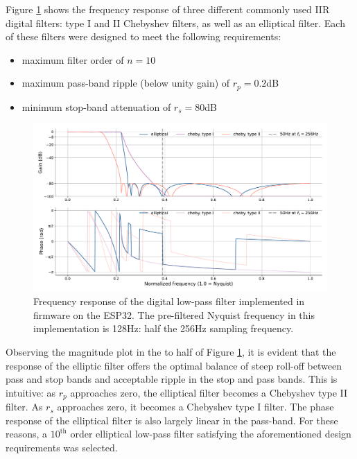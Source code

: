 Figure \ref{fig:digital-filt-resp} shows the frequency response of three different commonly used IIR digital filters: type I and II Chebyshev filters, as well as an elliptical filter. Each of these filters were designed to meet the following requirements:
\begin{itemize}
\label{list:filter-design-reqs}
    \item maximum filter order of $n=10$
    \item maximum pass-band ripple (below unity gain) of $r_p=0.2$dB 
    \item minimum stop-band attenuation of $r_s=80$dB
\end{itemize}

\begin{figure}[h]
    \centering
    \includegraphics[width=\textwidth]{digital-filt-resp}
    \caption[Frequency response of the digital low-pass filter implemented in firmware on the ESP32]{Frequency response of the digital low-pass filter implemented in firmware on the ESP32. The pre-filtered Nyquist frequency in this implementation is 128Hz: half the 256Hz sampling frequency.}
    \label{fig:digital-filt-resp}
\end{figure}
Observing the magnitude plot in the to half of Figure \ref{fig:digital-filt-resp}, it is evident that the response of the elliptic filter offers the optimal balance of steep roll-off between pass and stop bands and acceptable ripple in the stop and pass bands. This is intuitive: as $r_p$ approaches zero, the elliptical filter becomes a Chebyshev type II filter. As $r_s$ approaches zero, it becomes a Chebyshev type I filter. The phase response of the elliptical filter is also largely linear in the pass-band. For these reasons, a $10^{\textrm{th}}$ order elliptical low-pass filter satisfying the aforementioned design requirements was selected.

